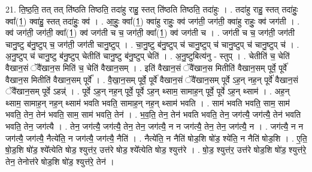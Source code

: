 \documentclass[17pt]{extarticle}
\begin{document}
21. ति॒ष्ठ॒ति॒ तत् तत् ति॑ष्ठति तिष्ठति॒ तदा॑हु राहु॒ स्तत् ति॑ष्ठति तिष्ठति॒ तदा॑हुः । . तदा॑हु राहु॒ स्तत् तदा॑हुः॒ क्वा᳚(1॒) क्वा॑हु॒ स्तत् तदा॑हुः॒ क्व॑ । . आ॒हुः॒ क्वा᳚(1॒) क्वा॑हु राहुः॒ क्व॑ जग॑ती॒ जग॑ती॒ क्वा॑हु राहुः॒ क्व॑ जग॑ती । . क्व॑ जग॑ती॒ जग॑ती॒ क्वा᳚(1॒) क्व॑ जग॑ती च च॒ जग॑ती॒ क्वा᳚(1॒) क्व॑ जग॑ती च । . जग॑ती च च॒ जग॑ती॒ जग॑ती चानु॒ष्टु ब॑नु॒ष्टुप् च॒ जग॑ती॒ जग॑ती चानु॒ष्टुप् । . चा॒नु॒ष्टु ब॑नु॒ष्टुप् च॑ चानु॒ष्टुप् च॑ चानु॒ष्टुप् च॑ चानु॒ष्टुप् च॑ । . अ॒नु॒ष्टुप् च॑ चानु॒ष्टु ब॑नु॒ष्टुप् चेतीति॑ चानु॒ष्टु ब॑नु॒ष्टुप् चेति॑ । . अ॒नु॒ष्टुबित्य॑नु - स्तुप् । . चेतीति॑ च॒ चेति॑ वैखान॒सं ॅवै॑खान॒स मिति॑ च॒ चेति॑ वैखान॒सम् । . इति॑ वैखान॒सं ॅवै॑खान॒स मितीति॑ वैखान॒सम् पूर्वे॒ पूर्वे॑ वैखान॒स मितीति॑ वैखान॒सम् पूर्वे᳚ । . वै॒खा॒न॒सम् पूर्वे॒ पूर्वे॑ वैखान॒सं ॅवै॑खान॒सम् पूर्वे ऽह॒न् नह॒न् पूर्वे॑ वैखान॒सं ॅवै॑खान॒सम् पूर्वे ऽहन्न्॑ । . पूर्वे ऽह॒न् नह॒न् पूर्वे॒ पूर्वे ऽह॒न् थ्साम॒ सामाह॒न् पूर्वे॒ पूर्वे ऽह॒न् थ्साम॑ । . अह॒न् थ्साम॒ सामाह॒न् नह॒न् थ्साम॑ भवति भवति॒ सामाह॒न् नह॒न् थ्साम॑ भवति । . साम॑ भवति भवति॒ साम॒ साम॑ भवति॒ तेन॒ तेन॑ भवति॒ साम॒ साम॑ भवति॒ तेन॑ । . भ॒व॒ति॒ तेन॒ तेन॑ भवति भवति॒ तेन॒ जग॑त्यै॒ जग॑त्यै॒ तेन॑ भवति भवति॒ तेन॒ जग॑त्यै । . तेन॒ जग॑त्यै॒ जग॑त्यै॒ तेन॒ तेन॒ जग॑त्यै॒ न न जग॑त्यै॒ तेन॒ तेन॒ जग॑त्यै॒ न । . जग॑त्यै॒ न न जग॑त्यै॒ जग॑त्यै॒ नैत्ये॑ति॒ न जग॑त्यै॒ जग॑त्यै॒ नैति॑ । . नैत्ये॑ति॒ न नैति॑ षोड॒शि षो॑ड॒ श्ये॑ति॒ न नैति॑ षोड॒शि । . ए॒ति॒ षो॒ड॒शि षो॑ड॒ श्ये᳚त्येति षोड॒ श्युत्त॑र॒ उत्त॑रे षोड॒ श्ये᳚त्येति षोड॒ श्युत्त॑रे । . षो॒ड॒ श्युत्त॑र॒ उत्त॑रे षोड॒शि षो॑ड॒ श्युत्त॑रे॒ तेन॒ तेनोत्त॑रे षोड॒शि षो॑ड॒ श्युत्त॑रे॒ तेन॑ । \newline
\end{document}
